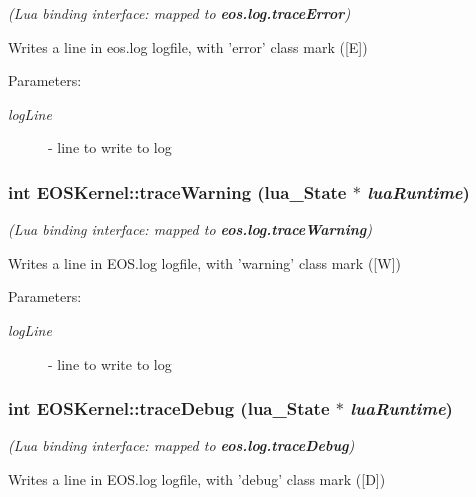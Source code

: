 {\em (Lua binding interface: mapped to {\bf eos.log.traceError})\/}\par
\par
 Writes a line in eos.log logfile, with 'error' class mark (\mbox{[}E\mbox{]}) 

\begin{Desc}
\item[Parameters:]
\begin{description}
\item[{\em logLine}]- line to write to log \end{description}
\end{Desc}
\hypertarget{structEOSKernel_186131b875c0871e4b0e5d4f9a484b16}{
\subsubsection[{traceWarning}]{\setlength{\rightskip}{0pt plus 5cm}int EOSKernel::traceWarning (lua\_\-State $\ast$ {\em luaRuntime})}}
\label{structEOSKernel_186131b875c0871e4b0e5d4f9a484b16}


{\em (Lua binding interface: mapped to {\bf eos.log.traceWarning})\/}\par
\par
 Writes a line in EOS.log logfile, with 'warning' class mark (\mbox{[}W\mbox{]}) 

\begin{Desc}
\item[Parameters:]
\begin{description}
\item[{\em logLine}]- line to write to log \end{description}
\end{Desc}
\hypertarget{structEOSKernel_3407dd17642df22065837296f2a49f8a}{
\subsubsection[{traceDebug}]{\setlength{\rightskip}{0pt plus 5cm}int EOSKernel::traceDebug (lua\_\-State $\ast$ {\em luaRuntime})}}
\label{structEOSKernel_3407dd17642df22065837296f2a49f8a}


{\em (Lua binding interface: mapped to {\bf eos.log.traceDebug})\/}\par
\par
 Writes a line in EOS.log logfile, with 'debug' class mark (\mbox{[}D\mbox{]}) 

